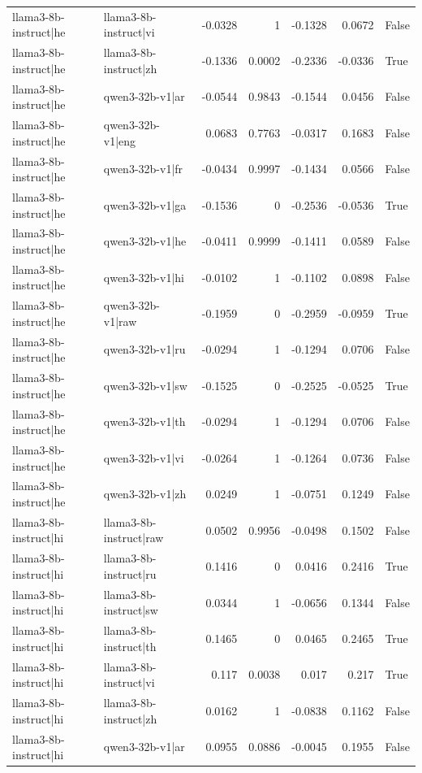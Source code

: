 \begin{table}
\begin{tabular}{l l r r r r l}
llama3-8b-instruct|he & llama3-8b-instruct|vi & -0.0328 & 1 & -0.1328 & 0.0672 & False \\
llama3-8b-instruct|he & llama3-8b-instruct|zh & -0.1336 & 0.0002 & -0.2336 & -0.0336 & True \\
llama3-8b-instruct|he & qwen3-32b-v1|ar & -0.0544 & 0.9843 & -0.1544 & 0.0456 & False \\
llama3-8b-instruct|he & qwen3-32b-v1|eng & 0.0683 & 0.7763 & -0.0317 & 0.1683 & False \\
llama3-8b-instruct|he & qwen3-32b-v1|fr & -0.0434 & 0.9997 & -0.1434 & 0.0566 & False \\
llama3-8b-instruct|he & qwen3-32b-v1|ga & -0.1536 & 0 & -0.2536 & -0.0536 & True \\
llama3-8b-instruct|he & qwen3-32b-v1|he & -0.0411 & 0.9999 & -0.1411 & 0.0589 & False \\
llama3-8b-instruct|he & qwen3-32b-v1|hi & -0.0102 & 1 & -0.1102 & 0.0898 & False \\
llama3-8b-instruct|he & qwen3-32b-v1|raw & -0.1959 & 0 & -0.2959 & -0.0959 & True \\
llama3-8b-instruct|he & qwen3-32b-v1|ru & -0.0294 & 1 & -0.1294 & 0.0706 & False \\
llama3-8b-instruct|he & qwen3-32b-v1|sw & -0.1525 & 0 & -0.2525 & -0.0525 & True \\
llama3-8b-instruct|he & qwen3-32b-v1|th & -0.0294 & 1 & -0.1294 & 0.0706 & False \\
llama3-8b-instruct|he & qwen3-32b-v1|vi & -0.0264 & 1 & -0.1264 & 0.0736 & False \\
llama3-8b-instruct|he & qwen3-32b-v1|zh & 0.0249 & 1 & -0.0751 & 0.1249 & False \\
llama3-8b-instruct|hi & llama3-8b-instruct|raw & 0.0502 & 0.9956 & -0.0498 & 0.1502 & False \\
llama3-8b-instruct|hi & llama3-8b-instruct|ru & 0.1416 & 0 & 0.0416 & 0.2416 & True \\
llama3-8b-instruct|hi & llama3-8b-instruct|sw & 0.0344 & 1 & -0.0656 & 0.1344 & False \\
llama3-8b-instruct|hi & llama3-8b-instruct|th & 0.1465 & 0 & 0.0465 & 0.2465 & True \\
llama3-8b-instruct|hi & llama3-8b-instruct|vi & 0.117 & 0.0038 & 0.017 & 0.217 & True \\
llama3-8b-instruct|hi & llama3-8b-instruct|zh & 0.0162 & 1 & -0.0838 & 0.1162 & False \\
llama3-8b-instruct|hi & qwen3-32b-v1|ar & 0.0955 & 0.0886 & -0.0045 & 0.1955 & False \\

\end{tabular}
\end{table}
